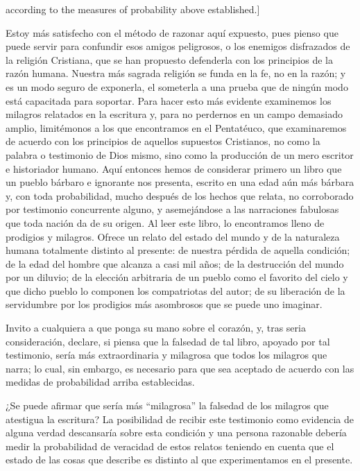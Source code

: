   according to the measures of probability above established.]{Estoy más
    satisfecho con el método de razonar aquí expuesto, pues pienso que puede
    servir para confundir esos amigos peligrosos, o los enemigos disfrazados de la
    religión Cristiana, que se han propuesto defenderla con los principios de la
    razón humana. Nuestra más sagrada religión se funda en la fe, no en la razón;
    y es un modo seguro de exponerla, el someterla a una prueba que de ningún modo
    está capacitada para soportar. Para hacer esto más evidente examinemos los
    milagros relatados en la escritura y, para no perdernos en un campo demasiado
    amplio, limitémonos a los que encontramos en el Pentatéuco, que examinaremos
    de acuerdo con los principios de aquellos supuestos Cristianos, no como la
    palabra o testimonio de Dios mismo, sino como la producción de un mero
    escritor e historiador humano. Aquí entonces hemos de considerar primero un
    libro que un pueblo bárbaro e ignorante nos presenta, escrito en una edad aún
    más bárbara y, con toda probabilidad, mucho después de los hechos que relata,
    no corroborado por testimonio concurrente alguno, y asemejándose a las
    narraciones fabulosas que toda nación da de su origen. Al leer este libro, lo
    encontramos lleno de prodigios y milagros. Ofrece un relato del estado del
    mundo y de la naturaleza humana totalmente distinto al presente: de nuestra
    pérdida de aquella condición; de la edad del hombre que alcanza a casi mil
    años; de la destrucción del mundo por un diluvio; de la elección arbitraria de
    un pueblo como el favorito del cielo y que dicho pueblo lo componen los
    compatriotas del autor; de su liberación de la servidumbre por los prodigios
    más asombrosos que se puede uno imaginar.

    Invito a cualquiera a que ponga su mano sobre el corazón, y, tras seria
    consideración, declare, si piensa que la falsedad de tal libro, apoyado por
    tal testimonio, sería más extraordinaria y milagrosa que todos los milagros
    que narra; lo cual, sin embargo, es necesario para que sea aceptado de acuerdo
    con las medidas de probabilidad arriba establecidas.}

  ¿Se puede afirmar que sería más \enquote{milagrosa} la falsedad de los milagros
  que atestigua la escritura? La posibilidad de recibir este testimonio como
  evidencia de alguna verdad descansaría sobre esta condición y una persona
  razonable debería medir la probabilidad de veracidad de estos relatos teniendo
  en cuenta que el estado de las cosas que describe es distinto al que
  experimentamos en el presente.

